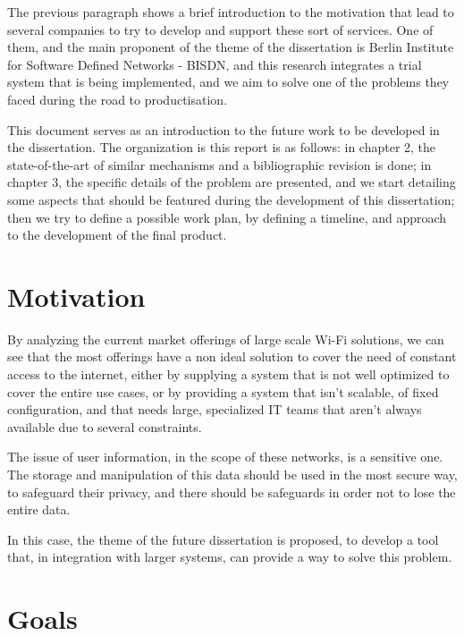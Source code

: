\par The previous paragraph shows a brief introduction to the motivation that lead to several companies to try to develop and support these sort of services. One of them, and the main proponent of the theme of the dissertation is Berlin Institute for Software Defined Networks - BISDN, and this research integrates a trial system that is being implemented, and we aim to solve one of the problems they faced during the road to productisation.
 
\par This document serves as an introduction to the future work to be developed in the dissertation. The organization is this report is as follows: in chapter 2, the state-of-the-art of similar mechanisms and a bibliographic revision is done; in chapter 3, the specific details of the problem are presented, and we start detailing some aspects that should be featured during the development of this dissertation; then we try to define a possible work plan, by defining a timeline, and approach to the development of the final product.


\section {Motivation}
\hspace{0.5cm} 

By analyzing the current market offerings of large scale Wi-Fi solutions, we can see that the most offerings have a non ideal solution to cover the need of constant access to the internet, either by supplying a system that is not well optimized to cover the entire use cases, or by providing a system that isn't scalable, of fixed configuration, and that needs large, specialized IT teams that aren't always available due to several constraints. 
\par The issue of user information, in the scope of these networks, is a sensitive one. The storage and manipulation of this data should be used in the most secure way, to safeguard their privacy, and there should be safeguards in order not to lose the entire data. 
\par In this case, the theme of the future dissertation is proposed, to develop a tool that, in integration with larger systems, can provide a way to solve this problem.

\section {Goals}
\hspace{0.5cm} 

